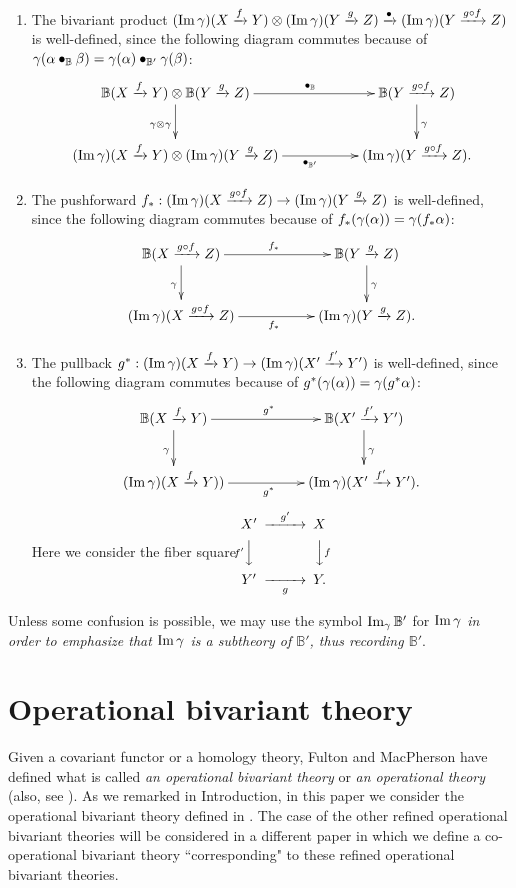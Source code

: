 \documentclass[a4paper]{amsart}
\begin{document}
\begin{enumerate}
\item The bivariant product $(\operatorname{Im}\gamma) (X \xrightarrow f Y) \otimes (\operatorname{Im}\gamma) (Y \xrightarrow g Z) \xrightarrow {\bullet} (\operatorname{Im}\gamma) (Y \xrightarrow {g \circ f}  Z)$ is well-defined, since the following diagram commutes because of $\gamma (\alpha \bullet_{\mathbb B} \beta) = \gamma (\alpha) \bullet _{\mathbb B'} \gamma (\beta)$:
$$
\xymatrix
{
\mathbb B(X \xrightarrow f Y) \otimes \mathbb B(Y \xrightarrow g Z)   \ar[rr]^{\qquad \bullet_{\mathbb B}} \ar[d]_{\ga \otimes \ga} && \mathbb B(Y \xrightarrow {g \circ f}  Z) \ar[d]^{\ga}\\
(\op{Im}\ga) (X \xrightarrow f Y) \otimes (\op{Im}\ga) (Y \xrightarrow g Z)   \ar[rr]_{\qquad \bullet_{\mathbb B'}} && (\op{Im}\ga) (Y \xrightarrow {g \circ f}  Z).
}
$$
\item The pushforward $f_*: (\operatorname{Im}\gamma) (X \xrightarrow {g \circ f} Z) \to (\operatorname{Im}\gamma) (Y \xrightarrow g Z)$  is well-defined, since the following diagram commutes because of $f_*(\gamma(\alpha))=\gamma(f_*\alpha)$:
$$
\xymatrix
{
\mathbb B(X \xrightarrow {g \circ f} Z) \ar[rr]^{f_*} \ar[d]_{\ga} && \mathbb B(Y \xrightarrow g Z) \ar[d]^{\ga}\\
(\op{Im}\ga) (X \xrightarrow {g \circ f} Z) \ar[rr]_{f_*} && (\op{Im}\ga) (Y \xrightarrow g Z).
}
$$
\item The pullback $g^*: (\operatorname{Im}\gamma) (X \xrightarrow f  Y) \to (\operatorname{Im}\gamma) (X' \xrightarrow {f'} Y')$  is well-defined, since the following diagram commutes because of $g^*(\gamma(\alpha))=\gamma(g^* \alpha)$:
$$
\xymatrix
{
\mathbb B(X \xrightarrow f Y) \ar[rr]^{g^*} \ar[d]_{\ga} && \mathbb B(X' \xrightarrow {f'} Y') \ar[d]^{\ga}\\
(\op{Im}\ga) (X \xrightarrow f Y)) \ar[rr]_{g^*} && (\op{Im}\ga) (X' \xrightarrow {f'} Y').
}
$$
Here we consider the fiber square \quad 
$\CD
X' @> {g'} >> X \\
@V {f'}VV @VV {f}V\\
Y' @>> {g} > Y. \endCD
$
\end{enumerate}
Unless some confusion is possible, we may use the symbol $\operatorname{Im}_{\gamma} \mathbb B'$ for $\operatorname{Im}\gamma$ \emph{in order to emphasize that $\operatorname{Im}\gamma$ is a subtheory of $\mathbb B'$, thus recording $\mathbb B'$}.

\section{Operational bivariant theory}\label{obt}
Given a covariant functor or a homology theory, Fulton and MacPherson have defined what is called \emph{an operational bivariant theory} or \emph{an operational theory} \cite[\S 8 Operational Theories]{FM} (also, see \cite[\S 17. 1 and \S 17.2]{Ful}). As we remarked in Introduction, in this paper we consider the operational bivariant theory defined in \cite[\S 8.1]{FM}. The case of the other refined operational bivariant theories will be considered in a different paper in which we define
a co-operational bivariant theory ``corresponding" to these refined operational bivariant theories.
\end{document}

